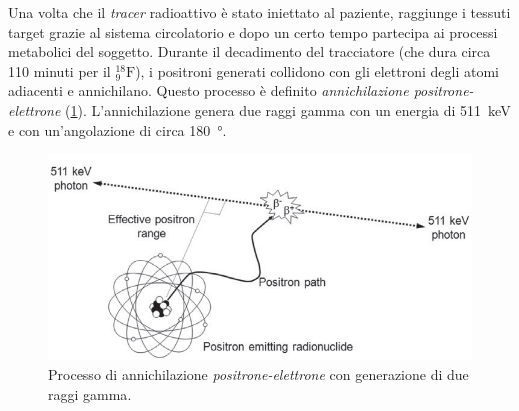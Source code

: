 Una volta che il \textit{tracer} radioattivo è stato iniettato al paziente, raggiunge i tessuti target grazie al sistema circolatorio e dopo un certo tempo partecipa ai processi metabolici del soggetto. Durante il decadimento del tracciatore (che dura circa 110 minuti per il $^{18}_9\text{F}$), i positroni generati collidono con gli elettroni degli atomi adiacenti e annichilano. Questo processo è definito \textit{annichilazione positrone-elettrone} (\Fig\ref{fig:annihilation}). L'annichilazione genera due raggi gamma con un energia di \SI{511}{\kilo\electronvolt} e con un'angolazione di circa \SI{180}{\degree}.
\begin{figure}[h]
	\centering
	\includegraphics[width=0.8\linewidth]{./ImageFiles/annihilation}
	\caption{Processo di annichilazione \textit{positrone-elettrone} con generazione di due raggi gamma\cite{Bailey2014}.}
	\label{fig:annihilation}
\end{figure}
